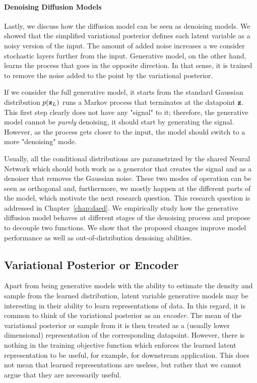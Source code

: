 \paragraph{Denoising Diffusion Models}
Lastly, we discuss how the diffusion model can be seen as denoising models. We showed that the simplified variational posterior defines each latent variable as a noisy version of the input. The amount of added noise increases a we consider stochastic layers further from the input. 
Generative model, on the other hand, learns the process that goes in the opposite direction. In that sense, it is trained to remove the noise added to the point by the variational posterior. 

If we consider the full generative model, it starts from the standard Gaussian distribution $p({\mathbf{z}}_L)$ runs a Markov process that terminates at the datapoint ${\mathbf{z}}$. This first step clearly does not have any "signal" to it; therefore, the generative model cannot be \textit{purely} denoising, it should start by generating the signal. However, as the process gets closer to the input, the model should switch to a more "denoising" mode. 

Usually, all the conditional distributions are parametrized by the shared Neural Network which should both work as a generator that creates the signal and as a denoiser that removes the Gaussian noise. These two modes of operation can be seen as orthogonal and, furthermore, we mostly happen at the different parts of the model, which motivate the next research question.
This research question is addressed in Chapter~\ref{chap:daed}. We empirically study how the generative diffusion model behaves at different stages of the denoising process and propose to decouple two functions. We show that the proposed changes improve model performance as well as out-of-distribution denoising abilities. 

\subsection{Variational Posterior or Encoder}
Apart from being generative models with the ability to estimate the density and sample from the learned distribution, latent variable generative models may be interesting in their ability to learn representations of data. 
In this regard, it is common to think of the variational posterior as an \textit{encoder}. The mean of the variational posterior or sample from it is then treated as a (usually lower dimensional) representation of the corresponding datapoint. 
However, there is nothing in the training objective function which enforces the learned latent representation to be useful, for example, for downstream application. 
This does not mean that learned representations are useless, but rather that we cannot argue that they are necessarily useful. 

